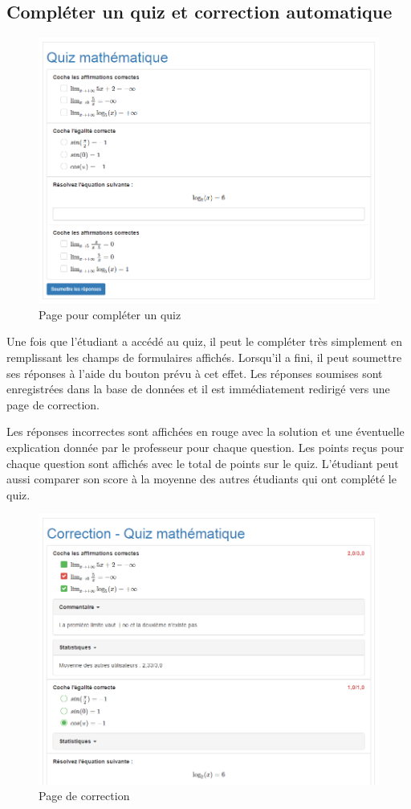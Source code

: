\documentclass[a4,10pt,french]{sphinxmanual}
\begin{document}
\subsection{Compléter un quiz et correction automatique}
\label{doc-user:completer-un-quiz-et-correction-automatique}\begin{figure}[htbp]
\centering
\capstart

\includegraphics[width=0.700\linewidth]{complete.png}
\caption{Page pour compléter un quiz}\end{figure}

Une fois que l'étudiant a accédé au quiz, il peut le compléter très simplement en remplissant les champs de formulaires affichés. Lorsqu'il a fini, il peut soumettre ses réponses à l'aide du bouton prévu à cet effet. Les réponses soumises sont enregistrées dans la base de données et il est immédiatement redirigé vers une page de correction.

Les réponses incorrectes sont affichées en rouge avec la solution et une éventuelle explication donnée par le professeur pour chaque question. Les points reçus pour chaque question sont affichés avec le total de points sur le quiz. L'étudiant peut aussi comparer son score à la moyenne des autres étudiants qui ont complété le quiz.
\begin{figure}[htbp]
\centering
\capstart

\includegraphics[width=0.700\linewidth]{correct.png}
\caption{Page de correction}\end{figure}
\end{document}
